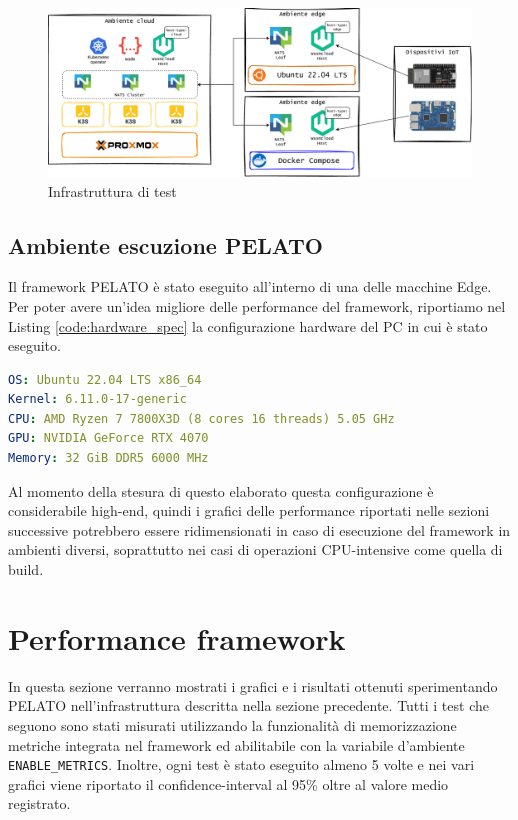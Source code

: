 \FloatBarrier
\begin{figure}[h]
    \centering
    \includegraphics[width=\textwidth]{img/schemi/schemi-infrastuttura-impl.drawio.pdf}
    \caption{Infrastruttura di test}
    \label{fig:infra_test}
\end{figure}
\FloatBarrier

\subsection{Ambiente escuzione PELATO}

Il framework PELATO è stato eseguito all'interno di una delle macchine Edge. Per poter avere un'idea migliore delle performance del framework, riportiamo nel Listing \ref{code:hardware_spec} la configurazione hardware del PC in cui è stato eseguito.

\begin{lstlisting}[language=yaml, caption={Specifiche Hardware nodo Edge}, captionpos=b, label={code:hardware_spec}]
OS: Ubuntu 22.04 LTS x86_64 
Kernel: 6.11.0-17-generic
CPU: AMD Ryzen 7 7800X3D (8 cores 16 threads) 5.05 GHz
GPU: NVIDIA GeForce RTX 4070
Memory: 32 GiB DDR5 6000 MHz                                                        
\end{lstlisting}

Al momento della stesura di questo elaborato questa configurazione è considerabile high-end, quindi i grafici delle performance riportati nelle sezioni successive potrebbero essere ridimensionati in caso di esecuzione del framework in ambienti diversi, soprattutto nei casi di operazioni CPU-intensive come quella di build.

\section{Performance framework}

In questa sezione verranno mostrati i grafici e i risultati ottenuti sperimentando PELATO nell'infrastruttura descritta nella sezione precedente. Tutti i test che seguono sono stati misurati utilizzando la funzionalità di memorizzazione metriche integrata nel framework ed abilitabile con la variabile d'ambiente \texttt{ENABLE\_METRICS}. Inoltre, ogni test è stato eseguito almeno 5 volte e nei vari grafici viene riportato il confidence-interval al 95\% oltre al valore medio registrato.


